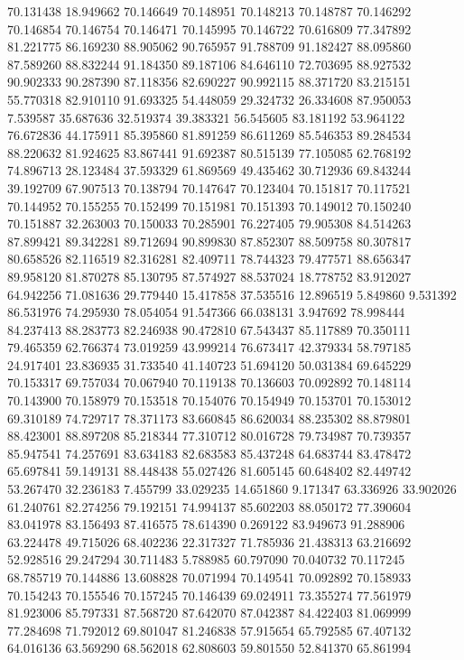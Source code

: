 70.131438
18.949662
70.146649
70.148951
70.148213
70.148787
70.146292
70.146854
70.146754
70.146471
70.145995
70.146722
70.616809
77.347892
81.221775
86.169230
88.905062
90.765957
91.788709
91.182427
88.095860
87.589260
88.832244
91.184350
89.187106
84.646110
72.703695
88.927532
90.902333
90.287390
87.118356
82.690227
90.992115
88.371720
83.215151
55.770318
82.910110
91.693325
54.448059
29.324732
26.334608
87.950053
7.539587
35.687636
32.519374
39.383321
56.545605
83.181192
53.964122
76.672836
44.175911
85.395860
81.891259
86.611269
85.546353
89.284534
88.220632
81.924625
83.867441
91.692387
80.515139
77.105085
62.768192
74.896713
28.123484
37.593329
61.869569
49.435462
30.712936
69.843244
39.192709
67.907513
70.138794
70.147647
70.123404
70.151817
70.117521
70.144952
70.155255
70.152499
70.151981
70.151393
70.149012
70.150240
70.151887
32.263003
70.150033
70.285901
76.227405
79.905308
84.514263
87.899421
89.342281
89.712694
90.899830
87.852307
88.509758
80.307817
80.658526
82.116519
82.316281
82.409711
78.744323
79.477571
88.656347
89.958120
81.870278
85.130795
87.574927
88.537024
18.778752
83.912027
64.942256
71.081636
29.779440
15.417858
37.535516
12.896519
5.849860
9.531392
86.531976
74.295930
78.054054
91.547366
66.038131
3.947692
78.998444
84.237413
88.283773
82.246938
90.472810
67.543437
85.117889
70.350111
79.465359
62.766374
73.019259
43.999214
76.673417
42.379334
58.797185
24.917401
23.836935
31.733540
41.140723
51.694120
50.031384
69.645229
70.153317
69.757034
70.067940
70.119138
70.136603
70.092892
70.148114
70.143900
70.158979
70.153518
70.154076
70.154949
70.153701
70.153012
69.310189
74.729717
78.371173
83.660845
86.620034
88.235302
88.879801
88.423001
88.897208
85.218344
77.310712
80.016728
79.734987
70.739357
85.947541
74.257691
83.634183
82.683583
85.437248
64.683744
83.478472
65.697841
59.149131
88.448438
55.027426
81.605145
60.648402
82.449742
53.267470
32.236183
7.455799
33.029235
14.651860
9.171347
63.336926
33.902026
61.240761
82.274256
79.192151
74.994137
85.602203
88.050172
77.390604
83.041978
83.156493
87.416575
78.614390
0.269122
83.949673
91.288906
63.224478
49.715026
68.402236
22.317327
71.785936
21.438313
63.216692
52.928516
29.247294
30.711483
5.788985
60.797090
70.040732
70.117245
68.785719
70.144886
13.608828
70.071994
70.149541
70.092892
70.158933
70.154243
70.155546
70.157245
70.146439
69.024911
73.355274
77.561979
81.923006
85.797331
87.568720
87.642070
87.042387
84.422403
81.069999
77.284698
71.792012
69.801047
81.246838
57.915654
65.792585
67.407132
64.016136
63.569290
68.562018
62.808603
59.801550
52.841370
65.861994
